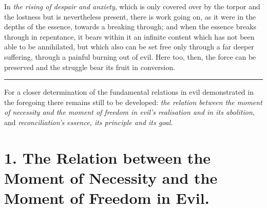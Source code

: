 \documentclass[12pt,a4paper]{book}
\begin{document}
In \emph{the rising of despair and anxiety}, which is only covered over by the
torpor and the lostness but is nevertheless present, there is work going on, as
it were in the depths of the essence, towards a breaking through; and when the
essence breaks through in repentance, it bears within it an infinite content
which has not been able to be annihilated, but which also can be set free only
through a far deeper suffering, through a painful burning out of evil. Here too,
then, the force can be preserved and the struggle bear its fruit in conversion.

\begin{center}\rule{2cm}{0.4pt}\end{center}

For a closer determination of the fundamental relations in evil demonstrated in
the foregoing there remains still to be developed: \emph{the relation between
the moment of necessity and the moment of freedom in evil's realisation and in
its abolition}, and \emph{reconciliation's essence, its principle and its goal.}

\section*{1. The Relation between the Moment of Necessity and the Moment of Freedom in Evil.}
\end{document}
